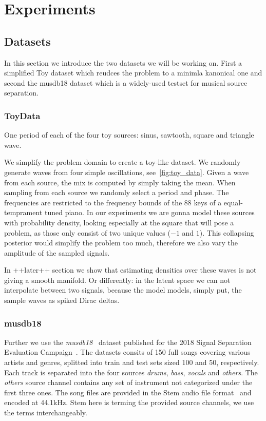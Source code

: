 \chapter{Experiments}%
\label{ch:experiments}

\section{Datasets}
In this section we introduce the two datasets we will be working on. First a simplified Toy dataset which reudces the problem to a minimla kanonical one and second the musdb18 dataset which is a widely-used testset for musical source separation.

\subsection{ToyData}
\begin{marginfigure}
    \resizebox{\textwidth}{!}{%
    }%
    \caption{One period of each of the four toy sources: sinus, sawtooth, square and triangle wave.}%
    \label{fig:toy_data}
\end{marginfigure}

We simplify the problem domain to create a toy-like dataset. We randomly generate waves from four simple oscillations, see~\cref{fig:toy_data}. Given a wave from each source, the mix is computed by simply taking the mean. When sampling from each source we randomly select a period and phase. The frequencies are restricted to the frequency bounds of the 88 keys of a equal-temprament tuned piano. In our experiments we are gonna model these sources with probability density, looking especially at the square that will pose a problem, as those only consist of two unique values (\(-1\) and \(1\)). This collapsing posterior would simplify the problem too much, therefore we also vary the amplitude of the sampled signals.

In ++later++ section we show that estimating densities over these waves is not giving a smooth manifold. Or differently: in the latent space we can not interpolate between two signals, because the model models, simply put, the sample waves as spiked Dirac deltas.


\subsection{musdb18}
Further we use the \emph{musdb18}~\cite{rafiiMUSDB182017} dataset published for the 2018 Signal Separation Evaluation Campaign~\cite{stoter20182018}. The datasets consits of 150 full songs covering various artists and genres, splitted into train and test sets sized 100 and 50, respectively. Each track is separated into the four sources \emph{drums}, \emph{bass}, \emph{vocals} and \emph{others}. The \emph{others} source channel contains any set of instrument not categorized under the first three ones. The song files are provided in the Stem audio file format~\cite{nativeinstrumentsStem} and encoded at 44.1kHz. Stem here is terming the provided source channels, we use the terms interchangeably.

